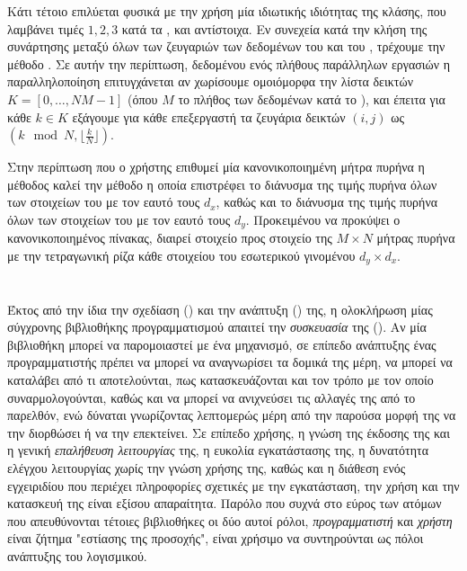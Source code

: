 Κάτι τέτοιο επιλύεται φυσικά με την χρήση μία ιδιωτικής ιδιότητας \texttt{} της κλάσης, που λαμβάνει τιμές $1, 2, 3$ κατά τα \texttt{}, \texttt{} και \texttt{} αντίστοιχα.
Εν συνεχεία κατά την κλήση της συνάρτησης \texttt{} μεταξύ όλων των ζευγαριών των δεδομένων του \texttt{} και του \texttt{}, τρέχουμε την μέθοδο \texttt{}.
Σε αυτήν την περίπτωση, δεδομένου ενός πλήθους παράλληλων εργασιών \texttt{} η παραλληλοποίηση επιτυγχάνεται αν χωρίσουμε ομοιόμορφα την λίστα δεικτών $K = [0, \dots, Ν Μ - 1]$ (όπου $Μ$ το πλήθος των δεδομένων κατά το \texttt{}), και έπειτα για κάθε $k \in K$ εξάγουμε για κάθε επεξεργαστή τα ζευγάρια δεικτών $(i,j)$ ως $(k\mod N, \lfloor \frac{k}{N} \rfloor)$.\par
Στην περίπτωση που ο χρήστης επιθυμεί μία κανονικοποιημένη μήτρα πυρήνα η μέθοδος \texttt{} καλεί την μέθοδο \texttt{} η οποία επιστρέφει το διάνυσμα της τιμής πυρήνα όλων των στοιχείων του \texttt{} με τον εαυτό τους $d_{x}$, καθώς και το διάνυσμα της τιμής πυρήνα όλων των στοιχείων του \texttt{} με τον εαυτό τους $d_{y}$.
Προκειμένου να προκύψει ο κανονικοποιημένος πίνακας, διαιρεί στοιχείο προς στοιχείο της $Μ \times N$ μήτρας πυρήνα με την τετραγωνική ρίζα κάθε στοιχείου του εσωτερικού γινομένου $d_{y} \times d_{x}$.


\section{}
Έκτος από την ίδια την σχεδίαση () και την ανάπτυξη () της, η ολοκλήρωση μίας σύγχρονης βιβλιοθήκης προγραμματισμού απαιτεί την \textit{συσκευασία} της ().
Αν μία βιβλιοθήκη μπορεί να παρομοιαστεί με ένα μηχανισμό, σε επίπεδο ανάπτυξης ένας προγραμματιστής πρέπει να μπορεί να αναγνωρίσει τα δομικά της μέρη, να μπορεί να καταλάβει από τι αποτελούνται, πως κατασκευάζονται και τον τρόπο με τον οποίο συναρμολογούνται, καθώς και να μπορεί να ανιχνεύσει τις αλλαγές της από το παρελθόν, ενώ δύναται γνωρίζοντας λεπτομερώς μέρη από την παρούσα μορφή της να την διορθώσει ή να την επεκτείνει.
Σε επίπεδο χρήσης, η γνώση της έκδοσης της και η γενική \textit{επαλήθευση λειτουργίας} της, η ευκολία εγκατάστασης της, η δυνατότητα ελέγχου λειτουργίας χωρίς την γνώση χρήσης της, καθώς και η διάθεση ενός εγχειριδίου που περιέχει πληροφορίες σχετικές με την εγκατάσταση, την χρήση και την κατασκευή της είναι εξίσου απαραίτητα.
Παρόλο που συχνά στο εύρος των ατόμων που απευθύνονται τέτοιες βιβλιοθήκες οι δύο αυτοί ρόλοι, \textit{προγραμματιστή} και \textit{χρήστη} είναι ζήτημα "εστίασης της προσοχής", είναι χρήσιμο να συντηρούνται ως πόλοι ανάπτυξης του λογισμικού.
